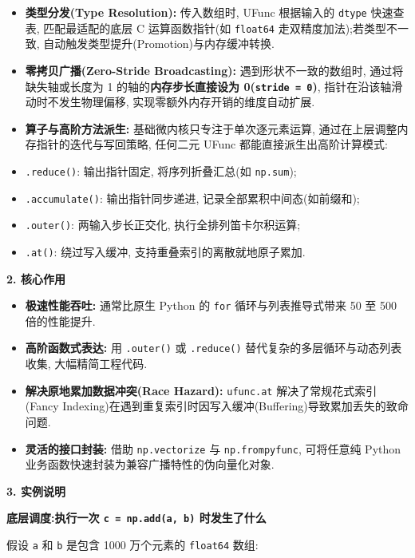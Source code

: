 \documentclass[11pt]{article}
\providecommand{\tightlist}{%
      \setlength{\itemsep}{0pt}\setlength{\parskip}{0pt}}
\begin{document}
\begin{itemize}
\tightlist
\item
  \textbf{类型分发(Type Resolution):} 传入数组时, UFunc 根据输入的
  \texttt{dtype} 快速查表, 匹配最适配的底层 C 运算函数指针(如
  \texttt{float64} 走双精度加法);若类型不一致,
  自动触发类型提升(Promotion)与内存缓冲转换.
\item
  \textbf{零拷贝广播(Zero-Stride Broadcasting):} 遇到形状不一致的数组时,
  通过将缺失轴或长度为 1 的轴的\textbf{内存步长直接设为
  0(\texttt{stride\ =\ 0})}, 指针在沿该轴滑动时不发生物理偏移,
  实现零额外内存开销的维度自动扩展.
\item
  \textbf{算子与高阶方法派生:} 基础微内核只专注于单次逐元素运算,
  通过在上层调整内存指针的迭代与写回策略, 任何二元 UFunc
  都能直接派生出高阶计算模式:
\item
  \texttt{.reduce()}: 输出指针固定, 将序列折叠汇总(如 \texttt{np.sum});
\item
  \texttt{.accumulate()}: 输出指针同步递进,
  记录全部累积中间态(如前缀和);
\item
  \texttt{.outer()}: 两输入步长正交化, 执行全排列笛卡尔积运算;
\item
  \texttt{.at()}: 绕过写入缓冲, 支持重叠索引的离散就地原子累加.
\end{itemize}

\textbf{2. 核心作用}

\begin{itemize}
\tightlist
\item
  \textbf{极速性能吞吐:} 通常比原生 Python 的 \texttt{for}
  循环与列表推导式带来 50 至 500 倍的性能提升.
\item
  \textbf{高阶函数式表达:} 用 \texttt{.outer()} 或 \texttt{.reduce()}
  替代复杂的多层循环与动态列表收集, 大幅精简工程代码.
\item
  \textbf{解决原地累加数据冲突(Race Hazard):} \texttt{ufunc.at}
  解决了常规花式索引(Fancy
  Indexing)在遇到重复索引时因写入缓冲(Buffering)导致累加丢失的致命问题.
\item
  \textbf{灵活的接口封装:} 借助 \texttt{np.vectorize} 与
  \texttt{np.frompyfunc}, 可将任意纯 Python
  业务函数快速封装为兼容广播特性的伪向量化对象.
\end{itemize}

\textbf{3. 实例说明}

\textbf{底层调度:执行一次 \texttt{c\ =\ np.add(a,\ b)} 时发生了什么}

假设 \texttt{a} 和 \texttt{b} 是包含 1000 万个元素的 \texttt{float64}
数组:
\end{document}
